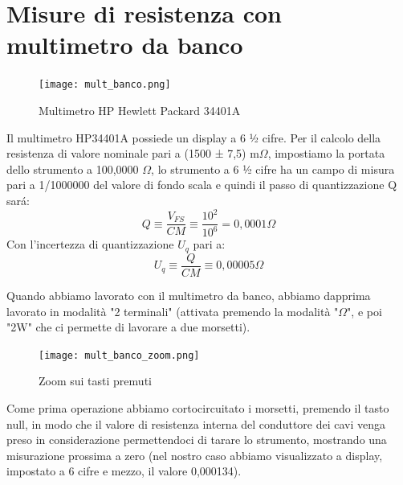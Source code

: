 \vspace{4cm}
\section{Misure di resistenza con multimetro da banco}
\label{sec:mult}


\begin{figure}[h]
    \centering
    \texttt{[image: mult\_banco.png]}
    \caption{Multimetro HP Hewlett Packard 34401A}
    \label{fig:mult_banco}
\end{figure}
\FloatBarrier

Il multimetro HP34401A possiede un display a 6 ½ cifre. 
Per il calcolo della resistenza di valore nominale pari a (1500 ± 7,5) m$\Omega$, impostiamo la portata dello strumento a 100,0000 $\Omega$, lo strumento a 6 ½ cifre ha un campo di misura 
pari a 1/1000000 del valore di fondo scala e quindi il passo di quantizzazione Q sar\'a: 
\begin{equation}
    Q \equiv \frac{V_{FS}}{CM} \equiv \frac{10^2}{10^6} = 0,0001 \Omega
\end{equation}
Con l'incertezza di quantizzazione $U_q$ pari a:
\begin{equation}
    U_q \equiv \frac{Q}{CM} \equiv 0,00005 \Omega
\end{equation}

Quando abbiamo lavorato con il multimetro da banco, abbiamo dapprima lavorato in modalità "2 terminali" (attivata premendo la modalità "$\Omega$", e poi "2W" che ci permette di lavorare a due morsetti).

\begin{figure}[h]
    \centering
    \texttt{[image: mult\_banco\_zoom.png]}
    \caption{Zoom sui tasti premuti}
    \label{fig:mult_banco_zoom}
\end{figure}
\FloatBarrier

Come prima operazione abbiamo cortocircuitato i morsetti, premendo il tasto null, in modo che il valore di resistenza interna del conduttore dei cavi venga preso in considerazione permettendoci di tarare lo strumento, mostrando una misurazione prossima a zero (nel nostro caso abbiamo visualizzato a display, impostato a 6 cifre e mezzo, il valore 0,000134).


